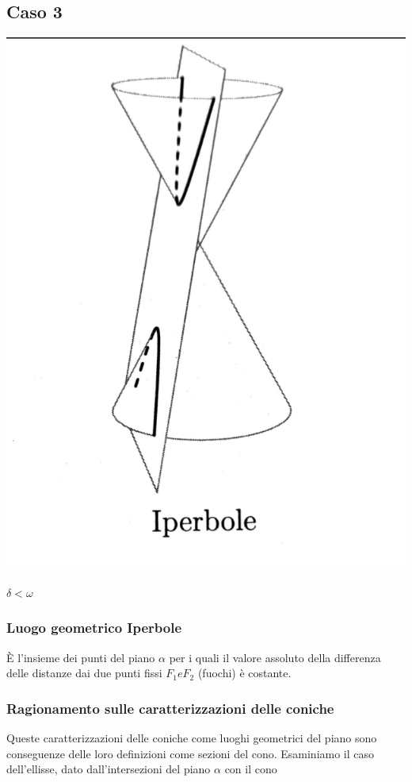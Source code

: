 \documentclass[a4paper,11pt]{article}
\begin{document}
\subsection{Caso 3}
\begin{center}
\begin{minipage}{8cm}
    \includegraphics[scale=0.3]{iperbole.png}
\end{minipage}
\end{center}
\(  \delta < \omega \)



\subsubsection{Luogo geometrico Iperbole}
È l'insieme dei punti del piano \( \alpha \) per i quali il valore assoluto della differenza delle distanze dai due punti fissi \( F_1 e F_2\) (fuochi) è costante.
  

\subsubsection{Ragionamento sulle caratterizzazioni delle coniche}
Queste caratterizzazioni delle coniche come luoghi geometrici del piano sono conseguenze delle loro definizioni come sezioni del cono.
Esaminiamo il caso dell'ellisse, dato dall'intersezioni del piano \( \alpha \) con il cono
\end{document}
